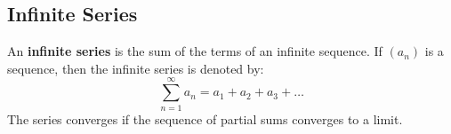 \subsection{Infinite Series}
An \textbf{infinite series} is the sum of the terms of an infinite sequence. If \((a_n)\) is a sequence, then the infinite series is denoted by:
\[ \sum_{n=1}^{\infty} a_n = a_1 + a_2 + a_3 + \ldots \]
The series converges if the sequence of partial sums converges to a limit.
